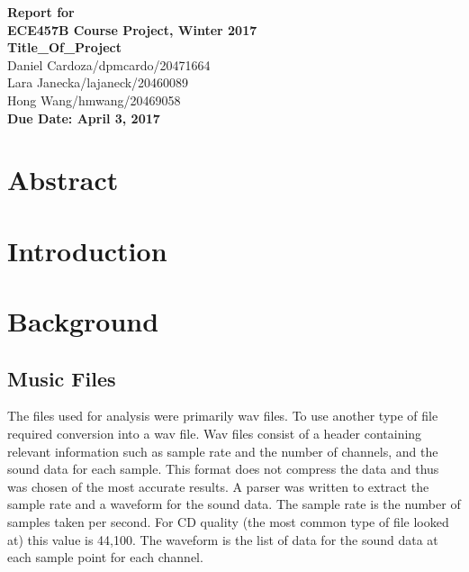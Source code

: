 \documentclass[12pt]{article}
\begin{document}
\begin{center}
{\Large\bf Report for}\\
\vspace{1mm}
{\Large\bf ECE457B Course Project, Winter 2017}\\
\vspace{2mm}
{\Large\bf Title\_Of\_Project}\\
\vspace{4mm}
{Daniel Cardoza/dpmcardo/20471664}\\
{Lara Janecka/lajaneck/20460089}\\
{Hong Wang/hmwang/20469058}\\
\vspace{2mm}
\textbf{Due Date: April 3, 2017}
\end{center}

\def\question#1{\item[\bf #1.]}
\def\part#1{\item[\bf #1)]}
\newcommand{\pc}[1]{\mbox{\textbf{#1}}} %

\section{Abstract}

\section{Introduction}



\section{Background}
\subsection{Music Files}
The files used for analysis were primarily wav files. To use another type of file required conversion into a wav file. Wav files consist of a header containing relevant information such as sample rate and the number of channels, and the sound data for each sample. This format does not compress the data and thus was chosen of the most accurate results. A parser was written to extract the sample rate and a waveform for the sound data. The sample rate is the number of samples taken per second. For CD quality (the most common type of file looked at) this value is 44,100. The waveform is the list of data for the sound data at each sample point for each channel.
\end{document}
